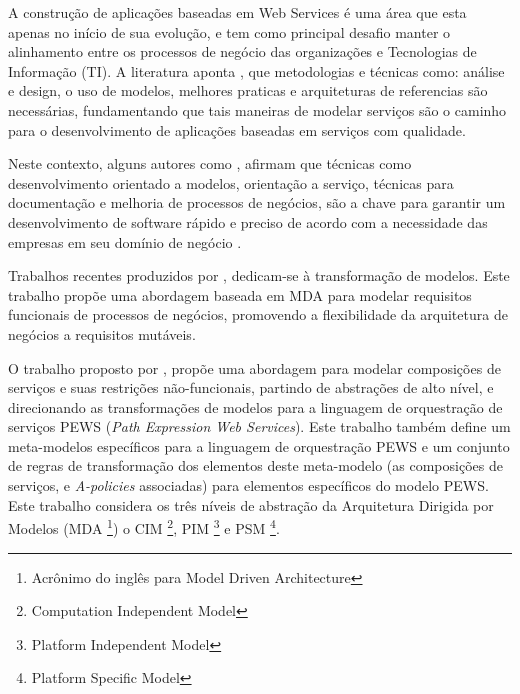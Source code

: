 
A construção de aplicações baseadas em Web Services é uma área que esta apenas no início de sua evolução, e tem como principal desafio manter o alinhamento entre os processos de negócio das organizações e Tecnologias de Informação (TI). A literatura aponta \cite{watson}, que metodologias e técnicas como: análise e design, o uso de modelos, melhores praticas e arquiteturas de referencias são necessárias, fundamentando que tais maneiras de modelar serviços são o caminho para o desenvolvimento de aplicações baseadas em serviços com qualidade\cite{Wesley}. 

Neste contexto, alguns autores como \cite{arsanjani,brown,papazoglou2006,towards}, afirmam que técnicas como desenvolvimento orientado a modelos, orientação a serviço, técnicas para documentação e melhoria de processos de negócios, são a chave para garantir um desenvolvimento de software rápido e preciso de acordo com a necessidade das empresas em seu domínio de negócio \cite{Papazoglou_Traverso}.

Trabalhos recentes produzidos por \cite{Zhang:2008}, dedicam-se à transformação de modelos. Este trabalho propõe uma abordagem baseada em MDA para modelar requisitos funcionais de processos de negócios, promovendo a flexibilidade da arquitetura de negócios a requisitos mutáveis. 

O trabalho proposto por \cite{Placido}, propõe uma abordagem para modelar composições de serviços e suas restrições não-funcionais, partindo de abstrações de alto nível, e direcionando as  transformações de modelos para a linguagem de orquestração de serviços PEWS (\textit{Path Expression Web Services}). Este trabalho também define um meta-modelos  específicos para a linguagem de orquestração PEWS e um conjunto de regras de transformação dos elementos deste meta-modelo (as composições de serviços, e \textit{A-policies} associadas) para elementos específicos do modelo PEWS. Este trabalho considera os três níveis de abstração da Arquitetura Dirigida por Modelos (MDA \footnote{Acrônimo do inglês para Model Driven Architecture}) o CIM \footnote{Computation Independent Model}, PIM \footnote{Platform Independent Model} e PSM \footnote{Platform Specific Model}.

